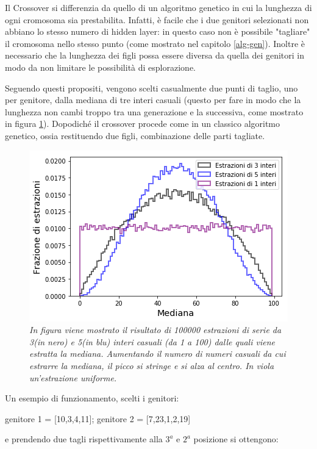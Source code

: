 \documentclass[12pt,a4paper]{report}
\begin{document}
Il Crossover si differenzia da quello di un algoritmo genetico in cui la lunghezza di ogni cromosoma sia prestabilita. 
Infatti, è facile che i due genitori selezionati non abbiano lo stesso numero di hidden layer: in questo caso non è possibile "tagliare" il cromosoma nello stesso punto (come mostrato nel capitolo \ref{alg-gen}).
Inoltre è necessario che la lunghezza dei figli possa essere diversa da quella dei genitori in modo da non limitare le possibilità di esplorazione.

Seguendo questi propositi, vengono scelti casualmente due punti di taglio, uno per genitore, dalla mediana di tre interi casuali (questo per fare in modo che la lunghezza non cambi troppo tra una generazione e la successiva, come mostrato in figura \ref{median}).
Dopodiché il crossover procede come in un classico algoritmo genetico, ossia restituendo due figli, combinazione delle parti tagliate.

\begin{figure}[H]
 \centering
 \includegraphics[scale = 0.7]{images/median-3-5}
 \caption{\textit{In figura viene mostrato il risultato di 100000 estrazioni di serie da 3(in nero) e 5(in blu) interi casuali (da 1 a 100) dalle quali viene estratta la mediana. Aumentando il numero di numeri casuali da cui estrarre la mediana, il picco si stringe e si alza al centro. In viola un'estrazione uniforme.}}
 \label{median}
\end{figure}

Un esempio di funzionamento, scelti i genitori:

\begin{center}
 genitore 1 = [10,3,4,11];  genitore 2 = [7,23,1,2,19]\\
\end{center}

e prendendo due tagli rispettivamente alla $3^{a}$ e $2^{a}$ posizione si ottengono:
\end{document}
